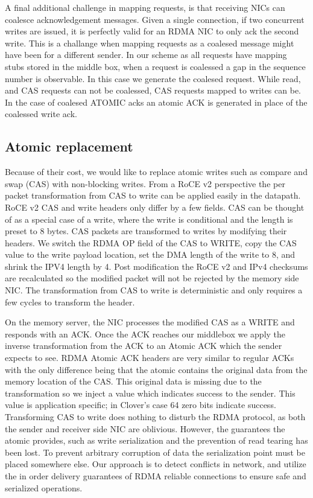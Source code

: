 A final additional challenge in mapping
requests, is that receiving NICs can coalesce acknowledgement messages. Given a
single connection, if two concurrent writes are issued, it is perfectly valid
for an RDMA NIC to only ack the second write. This is a challange when mapping
requests as a coalesed message might have been for a different sender. In our
scheme as all requests have mapping stubs stored in the middle box, when a
request is coalessed a gap in the sequence number is observable. In this case we
generate the coalesed request. While read, and CAS requests can not be
coalessed, CAS requests mapped to writes can be. In the case of coalesed ATOMIC
acks an atomic ACK is generated in place of the coalessed write ack.



\subsection{Atomic replacement} 


Because of their cost, we would like to replace atomic writes such as compare
and swap (CAS) with non-blocking writes.  From a RoCE v2 perspective the per
packet transformation from CAS to write can be applied easily in the datapath.
RoCE v2 CAS and write headers only differ by a few fields. CAS can be thought of
as a special case of a write, where the write is conditional and the length is
preset to 8 bytes.
CAS packets are transformed to writes by modifying their headers. We switch the
RDMA OP field of the CAS to WRITE, copy the CAS value to the write payload
location, set the DMA length of the write to 8, and shrink the IPV4 length by 4.
Post modification the RoCE v2 and IPv4 checksums are recalculated so the
modified packet will not be rejected by the memory side NIC. The transformation
from CAS to write is deterministic and only requires a few cycles to transform
the header.

On the memory server, the NIC processes the modified CAS as a WRITE and responds
with an ACK. Once the ACK reaches our middlebox we apply the inverse
transformation from the ACK to an Atomic ACK which the sender expects to see.
RDMA Atomic ACK headers are very similar to regular ACKs with the only
difference being that the atomic contains the original data from the memory
location of the CAS. This original data is missing due to the transformation so
we inject a value which indicates success to the sender.
This value is application specific; in Clover's case 64 zero bits indicate
success. Transforming CAS to write does nothing to disturb the RDMA protocol, as
both the sender and receiver side NIC are oblivious.  However, the guarantees
the atomic provides, such as write serialization and the prevention of read
tearing has been lost. To prevent arbitrary corruption of data the serialization
point must be placed somewhere else. Our approach is to detect conflicts in
network, and utilize the in order delivery guarantees of RDMA reliable
connections to ensure safe and serialized operations.




